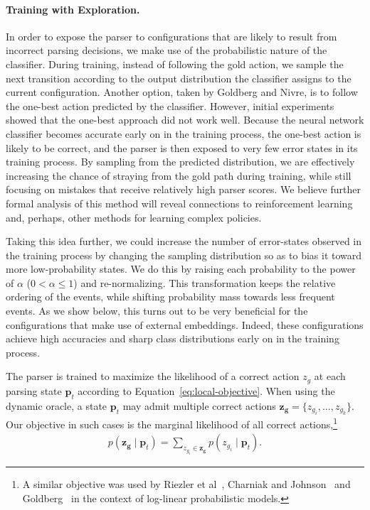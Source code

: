 \documentclass[11pt]{article}
\newcommand{\ignore}[1]{}
\newcommand{\nascomment}[1]{\textcolor{blue}{\textbf{[#1 --\textsc{nas}]}}}
\begin{document}
\paragraph{Training with Exploration.} In order to expose the parser to configurations that are likely to result from
incorrect parsing decisions, we make use of the probabilistic nature of the
classifier.
During training, instead of following the gold action, 
we sample the next transition according to
the output distribution the classifier assigns to the current
configuration. Another option, taken by Goldberg and Nivre, is to
follow the one-best action predicted by the classifier.  However, initial
experiments showed that the one-best approach did not work well. Because the
neural network classifier becomes accurate early on in the training process, the
one-best action is likely to be correct, and the parser is then exposed to very
few error states in its training process. By sampling from the predicted
distribution, we are effectively increasing the chance of straying from the gold
path during training, while still focusing on mistakes that receive relatively
high parser scores.
We believe further formal analysis of this method will reveal
connections to reinforcement learning and, perhaps, other methods for
learning complex policies.

Taking this idea further, we could increase the number of error-states observed
in the training process by changing the sampling distribution so
as to bias it toward more low-probability states. We do this by raising each
probability to the power of $\alpha$ ($0 < \alpha \leq 1$) and
re-normalizing. 
This transformation keeps the relative ordering of the events, while shifting
probability mass towards less frequent events.  As we show below, this turns out
to be very beneficial for the configurations that make use of external embeddings.
Indeed, these configurations achieve high accuracies and sharp class distributions 
early on in the training process.

The parser is trained to maximize the likelihood of a correct action $z_g$
at each parsing state $\mathbf{p}_t$ according to Equation~\ref{eq:local-objective}.  When using the dynamic oracle, a state $\mathbf{p}_t$
may admit multiple correct actions $\boldsymbol{z_g} = \{z_{g_i}, \ldots, z_{g_k}\}$. Our
objective in such cases is the marginal likelihood of all correct actions,\footnote{A similar objective was used by Riezler et
al~,
Charniak and Johnson~ and Goldberg~ in the
context of log-linear probabilistic models.
}
\begin{align}
    p(\boldsymbol{z_g} \mid \mathbf{p}_t) = \sum_{z_{g_i} \in \boldsymbol{z_g}}
    p(z_{g_i} \mid \mathbf{p}_t) .
\end{align}
\ignore{\nascomment{small notational change here to boldsymbol rather than
  mathbf for consistency with what we said in the ``Notation'' section}}
\end{document}
